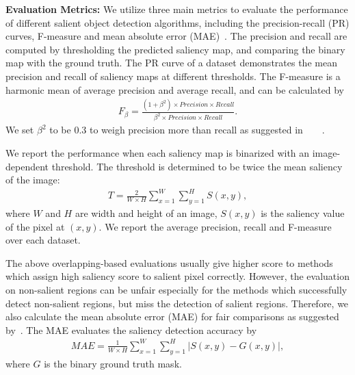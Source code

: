 \documentclass[10pt,twocolumn,letterpaper]{article}
\begin{document}
\textbf{Evaluation Metrics:}
We utilize three main metrics to evaluate the performance of different salient object detection algorithms, including the precision-recall (PR) curves, F-measure and mean absolute error (MAE)~\cite{borji2015salient}.
The precision and recall are computed by thresholding the predicted saliency map, and comparing the binary map with the ground truth.
The PR curve of a dataset demonstrates the mean precision and recall of saliency maps at different thresholds.
The F-measure is a harmonic mean of average precision and average recall, and can be calculated by
\vspace{-0.5mm}
\begin{align}
  F_{\beta} =\frac{(1+\beta^2)\times Precision\times Recall}{\beta^2\times Precision \times Recall}.
    \label{equ:equ19}
\end{align}
\vspace{-0.5mm}
We set $\beta^2$ to be 0.3 to weigh precision more than recall as suggested in~\cite{yan2013hierarchical}~\cite{wang2015deep}~\cite{borji2015salient}~\cite{yang2013saliency}.

We report the performance when each saliency map is binarized with an image-dependent threshold.
The threshold is determined to be twice the mean saliency of the image:
\begin{align}
T = \frac{2}{W\times H}\sum_{x=1}^{W}\sum_{y=1}^{H}S(x,y),
  \label{equ:equ3}
\end{align}
where $W$ and $H$ are width and height of an image, $S(x,y)$ is the saliency value of the pixel at
$(x,y)$. We report the average precision, recall and F-measure over each dataset.

The above overlapping-based evaluations usually give higher score to methods which assign high saliency score to salient pixel correctly.
However, the evaluation on non-salient regions can be unfair especially for the methods which successfully detect non-salient regions, but miss the detection of salient regions.
Therefore, we also calculate the mean absolute error (MAE) for fair comparisons as suggested by~\cite{borji2015salient}.
The MAE evaluates the saliency detection accuracy by
\vspace{-1mm}
\begin{align}
MAE = \frac{1}{W\times H}\sum_{x=1}^{W}\sum_{y=1}^{H}|S(x,y)-G(x,y)|,
  \label{equ:equ3}
\end{align}
\vspace{-0.5mm}
where $G$ is the binary ground truth mask.
\end{document}
